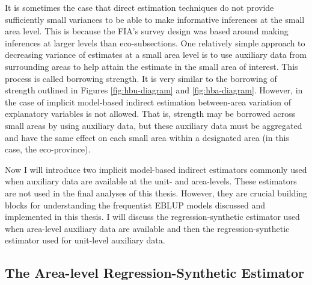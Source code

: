 \documentclass[12pt,twoside]{reedthesis}
\begin{document}
It is sometimes the case that direct estimation techniques do not provide sufficiently small variances to be able to make informative inferences at the small area level. This is because the FIA's survey design was based around making inferences at larger levels than eco-subsections. One relatively simple approach to decreasing variance of estimates at a small area level is to use auxiliary data from surrounding areas to help attain the estimate in the small area of interest. This process is called borrowing strength. It is very similar to the borrowing of strength outlined in Figures \ref{fig:hbu-diagram} and \ref{fig:hba-diagram}. However, in the case of implicit model-based indirect estimation between-area variation of explanatory variables is not allowed. That is, strength may be borrowed across small areas by using auxiliary data, but these auxiliary data must be aggregated and have the same effect on each small area within a designated area (in this case, the eco-province).

Now I will introduce two implicit model-based indirect estimators commonly used when auxiliary data are available at the unit- and area-levels. These estimators are not used in the final analyses of this thesis. However, they are crucial building blocks for understanding the frequentist EBLUP models discussed and implemented in this thesis. I will discuss the regression-synthetic estimator used when area-level auxiliary data are available and then the regression-synthetic estimator used for unit-level auxiliary data.

\hypertarget{the-area-level-regression-synthetic-estimator}{%
\subsection{The Area-level Regression-Synthetic Estimator}\label{the-area-level-regression-synthetic-estimator}}
\end{document}
